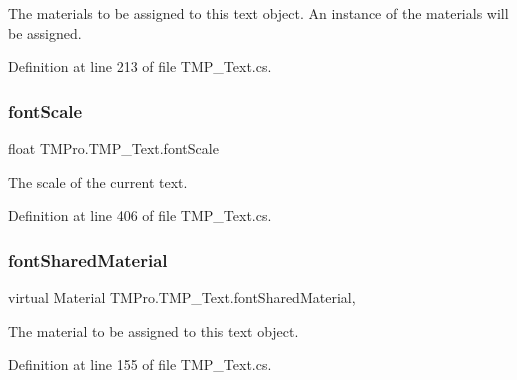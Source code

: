 The materials to be assigned to this text object. An instance of the materials will be assigned. 



Definition at line 213 of file T\+M\+P\+\_\+\+Text.\+cs.

\mbox{\label{class_t_m_pro_1_1_t_m_p___text_abf3c8050ad39a6a25615082085d4d05b}} 
\subsubsection{\texorpdfstring{fontScale}{fontScale}}
{\footnotesize\ttfamily float T\+M\+Pro.\+T\+M\+P\+\_\+\+Text.\+font\+Scale\hspace{0.3cm}{\ttfamily [get]}}



The scale of the current text. 



Definition at line 406 of file T\+M\+P\+\_\+\+Text.\+cs.

\mbox{\label{class_t_m_pro_1_1_t_m_p___text_ae8499604279c5c7af4ce94b3ba839a32}} 
\subsubsection{\texorpdfstring{fontSharedMaterial}{fontSharedMaterial}}
{\footnotesize\ttfamily virtual Material T\+M\+Pro.\+T\+M\+P\+\_\+\+Text.\+font\+Shared\+Material\hspace{0.3cm}{\ttfamily [get]}, {\ttfamily [set]}}



The material to be assigned to this text object. 



Definition at line 155 of file T\+M\+P\+\_\+\+Text.\+cs.

\mbox{\label{class_t_m_pro_1_1_t_m_p___text_ad5f432b62b573b9d9156443562c7d840}} 
